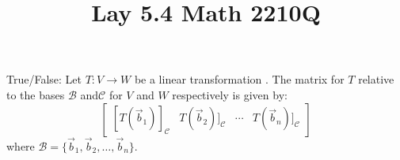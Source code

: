\documentclass{ximera}
\begin{document}
  	\title{Lay 5.4  \hfill Math 2210Q} 
  	  		    \begin{question} True/False: Let $T:V\to W$ be a linear transformation . The matrix for $T$ relative to the bases $\mathcal{B}$ and$\mathcal{C}$ for $V$ and $W$ respectively is given by:
  	  		    	$$\begin{bmatrix} [T(\vec{b}_1)]_{\mathcal{C}}& T(\vec{b}_2)]_{\mathcal{C}} &\cdots& T(\vec{b}_n)]_{\mathcal{C}}\end{bmatrix}$$
  	  		    	where $\mathcal{B} = \{\vec{b}_1,\vec{b}_2, \dots, \vec{b}_n  \}$.
  	  		    	
  	  		    	\begin{multipleChoice}
  	  		    	\end{multipleChoice}
  	  		    	
  	  		    \end{question}	
  	  		 
  
\end{document}
